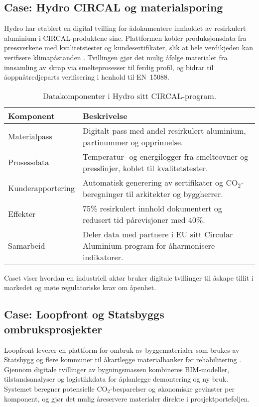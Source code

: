\subsection{Case: Hydro CIRCAL og materialsporing}
Hydro har etablert en digital tvilling for \aa dokumentere innholdet av resirkulert aluminium i CIRCAL-produktene sine. Plattformen kobler produksjonsdata fra pressverkene med kvalitetstester og kundesertifikater, slik at hele verdikjeden kan verifisere klimap\aa standen \citep{hydro2023traceability}. Tvillingen gj\o r det mulig \aa f\o lge materialet fra innsamling av skrap via smelteprosesser til ferdig profil, og bidrar til \aa oppn\aa tredjeparts verifisering i henhold til EN~15088.

\begin{table}[ht]
    \centering
    \caption{Datakomponenter i Hydro sitt CIRCAL-program.}
    \label{tab:kap03-hydro}
    \begin{tabular}{p{}p{}}
        \toprule
        \textbf{Komponent} & \textbf{Beskrivelse} \\
        \midrule
        Materialpass & Digitalt pass med andel resirkulert aluminium, partinummer og opprinnelse. \\
        Prosessdata & Temperatur- og energilogger fra smelteovner og presslinjer, koblet til kvalitetstester. \\
        Kunderapportering & Automatisk generering av sertifikater og CO$_2$-beregninger til arkitekter og byggherrer. \\
        Effekter & 75\% resirkulert innhold dokumentert og redusert tid p\aa revisjoner med 40\%. \\
        Samarbeid & Deler data med partnere i EU sitt Circular Aluminium-program for \aa harmonisere indikatorer. \\
        \bottomrule
    \end{tabular}
\end{table}

Caset viser hvordan en industriell akt\o r bruker digitale tvillinger til \aa skape tillit i markedet og m\o te regulatoriske krav om \aa penhet.

\subsection{Case: Loopfront og Statsbyggs ombruksprosjekter}
Loopfront leverer en plattform for ombruk av byggematerialer som brukes av Statsbygg og flere kommuner til \aa kartlegge materialbanker f\o r rehabilitering \citep{statsbygg2023loopfront}. Gjennom digitale tvillinger av bygningsmassen kombineres BIM-modeller, tilstandsanalyser og logistikkdata for \aa planlegge demontering og ny bruk. Systemet beregner potensielle CO$_2$-besparelser og \o konomiske gevinster per komponent, og gj\o r det mulig \aa reservere materialer direkte i prosjektportef\o ljen.

